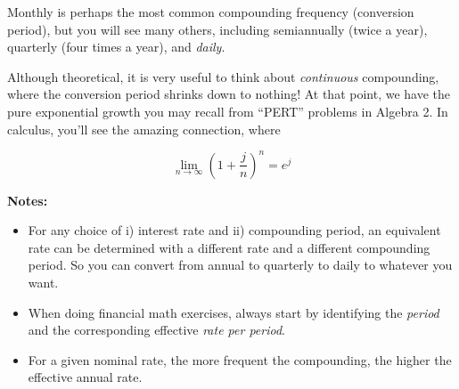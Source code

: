 \documentclass[14pt,twoside]{extarticle}
\begin{document}
\pagebreak

Monthly is perhaps the most common compounding frequency (conversion period), but you will see many
others, including semiannually (twice a year), quarterly (four times a year), and
\emph{daily}.

Although theoretical, it is very useful to think about \emph{continuous} compounding, where the conversion
period shrinks down to nothing!  At that point, we have the pure exponential growth you may recall from ``PERT''
problems in Algebra 2.  In calculus, you'll see the amazing connection, where

\[
  \lim_{n \to \infty} (1+\frac{j}{n})^n = e^j
\]

\textbf{Notes:}
\begin{itemize}
  \item For any choice of i) interest rate and ii) compounding period, an equivalent rate can be determined
        with a different rate and a different compounding period. So you can convert from annual to
        quarterly to daily to whatever you want.
  \item When doing financial math exercises, always start by identifying the \emph{period} and
        the corresponding effective \emph{rate per period}.
  \item For a given nominal rate, the more frequent the compounding, the higher the effective annual rate.

\end{itemize}
\end{document}
